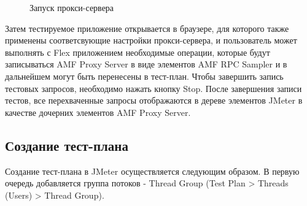 \begin{figure}[h]
\caption{Запуск прокси-сервера}
\label{ris:proxyStart.png}
\end{figure}

Затем тестируемое приложение открывается в браузере, для которого также
применены соответсвующие настройки прокси-сервера, и пользователь может выполнять с Flex приложением
необходимые операции, которые будут записываться AMF Proxy Server в виде элементов AMF RPC Sampler и в
дальнейшем могут быть перенесены в тест-план. Чтобы завершить запись тестовых запросов, необходимо
нажать кнопку Stop. После завершения записи тестов, все перехваченные запросы отображаются в дереве
элементов JMeter в качестве дочерних элементов AMF Proxy Server.

\subsection{Создание тест-плана}

Создание тест-плана в JMeter осуществляется следующим образом.
В первую очередь добавляется группа потоков - Thread Group (Test Plan > Threads (Users) > Thread Group).

